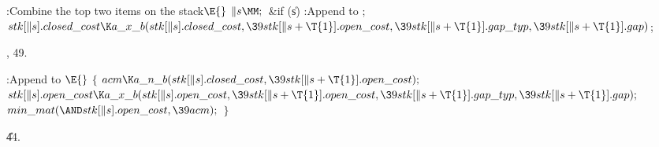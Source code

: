 \B{}:Combine the top two items on the stack\X${}\E{}$\6
$\|s\MM;{}$\6
\&{if} (\|s)\1\5
:Append  to \X;\2\6
${}\\{stk}[\|s].\\{closed\_cost}\K\\{a\_x\_b}(\\{stk}[\|s].\\{closed\_cost},\39%
\\{stk}[\|s+\T{1}].\\{open\_cost},\39\\{stk}[\|s+\T{1}].\\{gap\_typ},\39%
\\{stk}[\|s+\T{1}].\\{gap}){}$;\par
{}, 49.\fi

\B{}:Append  to \X${}\E{}$\6
${}\{{}$\1\6
${}\\{acm}\K\\{a\_n\_b}(\\{stk}[\|s].\\{closed\_cost},\39\\{stk}[\|s+\T{1}].%
\\{open\_cost});{}$\6
${}\\{stk}[\|s].\\{open\_cost}\K\\{a\_x\_b}(\\{stk}[\|s].\\{open\_cost},\39%
\\{stk}[\|s+\T{1}].\\{open\_cost},\39\\{stk}[\|s+\T{1}].\\{gap\_typ},\39%
\\{stk}[\|s+\T{1}].\\{gap});{}$\6
${}\\{min\_mat}({\AND}\\{stk}[\|s].\\{open\_cost},\39\\{acm});{}$\6
\4${}\}{}$\2\par
\U44.\fi

